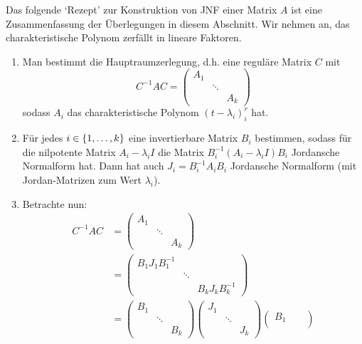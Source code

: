 \begin{bem}
	Das folgende `Rezept' zur Konstruktion von JNF einer Matrix $A$ ist eine Zusammenfassung der Überlegungen in diesem Abschnitt. Wir nehmen an, das charakteristische Polynom zerfällt in lineare Faktoren. 
	\begin{enumerate}
		\item
		Man bestimmt die Hauptraumzerlegung, d.h. eine reguläre Matrix $ C $ mit
		\begin{equation*}
			C^{-1}AC = \begin{pmatrix}
				A_1 && \\
				& \ddots & \\
				&& A_k
			\end{pmatrix}
		\end{equation*}
		sodass $ A_i $ das charakteristische Polynom $ (t-\lambda_i)^r_i $ hat.
		\item
		Für jedes $ i \in \{ 1,\ldots,k \} $ eine invertierbare Matrix $ B_i $ bestimmen, sodass für die nilpotente Matrix $ A_i - \lambda_i I $ die Matrix $ B_i^{-1}(A_i-\lambda_iI)B_i $ Jordansche Normalform hat. Dann hat auch $ J_i = B_i^{-1}A_iB_i $ Jordansche Normalform (mit Jordan-Matrizen zum Wert $ \lambda_i $).
		\item
		Betrachte nun:
		\begin{align*}
			C^{-1}AC &= \begin{pmatrix}
				A_1 && \\
				& \ddots & \\
				&& A_k
			\end{pmatrix} \\ & = \begin{pmatrix}
				B_1J_1B_1^{-1} && \\
				& \ddots & \\
				&& B_kJ_kB_k^{-1}
			\end{pmatrix} \\
			&= \begin{pmatrix}
				B_1 && \\
				& \ddots & \\
				&& B_k
			\end{pmatrix} \begin{pmatrix}
				J_1 && \\
				& \ddots & \\
				&& J_k
			\end{pmatrix} \begin{pmatrix}
				B_1 && \\

\end{pmatrix}
\end{align*}
\end{enumerate}
\end{bem}
